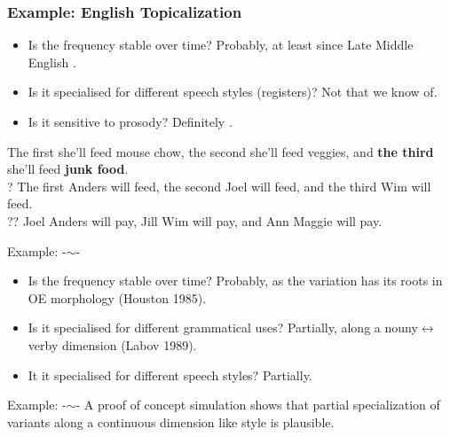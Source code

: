 \documentclass[hyperref={pdfpagelabels=false}]{beamer}
\begin{document}
\begin{frame}
\frametitle{Example: English Topicalization}

\begin{itemize}
	\item Is the frequency stable over time? Probably, at least since Late Middle English \citep{speyer2010}.
	\item Is it specialised for different speech styles (registers)? Not that we know of.
	\item Is it sensitive to prosody? Definitely \citep{speyer2010}.
\end{itemize}

	\begin{exe}

	\ex  The first she'll feed mouse chow, the second she'll feed veggies, and \textbf{the third} she'll feed  \textbf{junk food}.\\

	\ex  ? The first Anders will feed, the second Joel will feed, and the third Wim will feed. \\

	\ex  ?? Joel Anders will pay, Jill Wim will pay, and Ann Maggie will pay. \\

	\end{exe}
\end{frame}

\begin{frame}{Example: -$\sim$-}
	\begin{itemize}
		\item Is the frequency stable over time? Probably, as the variation has its roots in OE morphology (Houston 1985).
		\item Is it specialised for different grammatical uses? Partially, along a nouny$\leftrightarrow$verby dimension (Labov 1989).
		\item It it specialised for different speech styles? Partially.
	\end{itemize}


\end{frame}

\begin{frame}{Example: -$\sim$-}
	A proof of concept simulation shows that partial specialization of variants along a continuous dimension like style is plausible.
\end{frame}
\end{document}
